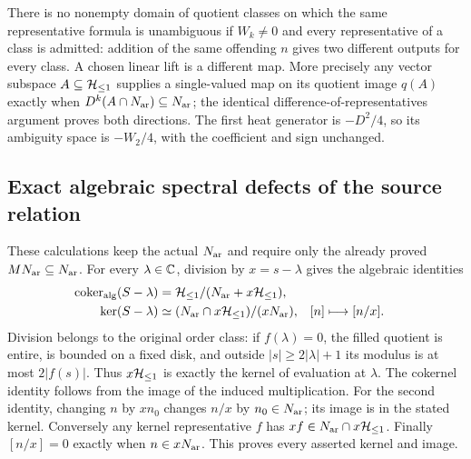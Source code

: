There is no nonempty domain of quotient classes on which the same
representative formula is unambiguous if $W_k\ne0$ and every
representative of a class is admitted: addition of the same offending
$n$ gives two different outputs for every class. A chosen linear
lift is a different map. More precisely any vector subspace
$A\subseteq\mathcal H_{\leq 1}$ supplies a single-valued map on its quotient image
$q(A)$ exactly when $D^k(A\cap N_{\rm ar})\subseteq N_{\rm ar}$; the identical
difference-of-representatives argument proves both directions.
The first heat generator is $-D^2/4$, so its ambiguity space is
$-W_2/4$, with the coefficient and sign unchanged.

\subsection{Exact algebraic spectral defects of the source relation}
\label{sec:cq-sourcealgebra}
These calculations keep the actual $N_{\rm ar}$ and require only the
already proved $MN_{\rm ar}\subseteq N_{\rm ar}$. For every $\lambda\in\mathbb C$,
division by $x=s-\lambda$ gives the algebraic identities
\begin{equation}\label{eq:cq-source-kercoker}
 \begin{aligned}
 \operatorname{coker}_{\rm alg}(S-\lambda)
     &=\mathcal H_{\leq 1}/(N_{\rm ar}+x\mathcal H_{\leq 1}),\\
 \ker(S-\lambda)&\simeq
        (N_{\rm ar}\cap x\mathcal H_{\leq 1})/(xN_{\rm ar}),
        & [n]&\longmapsto[n/x].
 \end{aligned}
\end{equation}
Division belongs to the original order class: if $f(\lambda)=0$,
the filled quotient is entire, is bounded on a fixed disk, and
outside $|s|\geq2|\lambda|+1$ its modulus is at most $2|f(s)|$.
Thus $x\mathcal H_{\leq 1}$ is exactly the kernel of evaluation at $\lambda$.
The cokernel identity follows from the image of the induced
multiplication. For the second identity, changing $n$ by $xn_0$
changes $n/x$ by $n_0\in N_{\rm ar}$; its image is in the stated
kernel. Conversely any kernel representative $f$ has
$xf\in N_{\rm ar}\cap x\mathcal H_{\leq 1}$. Finally $[n/x]=0$ exactly when
$n\in xN_{\rm ar}$. This proves every asserted kernel and image.

